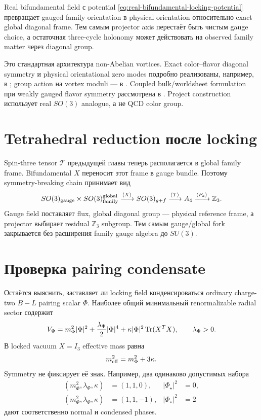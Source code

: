 \begin{theorem}
Real bifundamental field с potential
\eqref{eq:real-bifundamental-locking-potential} превращает gauged family
orientation в physical orientation относительно exact global diagonal
frame. Тем самым projector axis перестаёт быть чистым gauge choice, а
остаточная three-cycle holonomy может действовать на observed family
matter через diagonal group.
\end{theorem}

Это стандартная архитектура non-Abelian vortices. Exact color--flavor
diagonal symmetry и physical orientational zero modes подробно реализованы,
например, в ; group action на vortex moduli ---
в . Coupled bulk/worldsheet formulation при weakly
gauged flavor symmetry рассмотрена в . Project
construction использует real \(SO(3)\) analogue, а не QCD color group.

\section{Tetrahedral reduction после locking}

Spin-three tensor \(\mathcal T\) предыдущей главы теперь располагается в
global family frame. Bifundamental \(X\) переносит этот frame в gauge
bundle. Поэтому symmetry-breaking chain принимает вид
\begin{equation}
 SO(3)_{\rm gauge}\times SO(3)_{\rm family}^{\rm global}
 \xrightarrow{\langle X\rangle}
 SO(3)_{g+f}
 \xrightarrow{\langle\mathcal T\rangle}
 A_4
 \xrightarrow{\langle P_a\rangle}
 \mathbb Z_3.
 \label{eq:locked-tetrahedral-chain}
\end{equation}
Gauge field поставляет flux, global diagonal group --- physical reference
frame, а projector выбирает residual \(\mathbb Z_3\) subgroup. Тем самым
gauge/global fork закрывается без расширения family gauge algebra до
\(SU(3)\).

\section{Проверка pairing condensate}

Остаётся выяснить, заставляет ли locking field конденсироваться ordinary
charge-two \(B-L\) pairing scalar \(\Phi\). Наиболее общий минимальный
renormalizable radial sector содержит
\begin{equation}
 V_\Phi
 =m_\Phi^2|\Phi|^2
 +\frac{\lambda_\Phi}{2}|\Phi|^4
 +\kappa|\Phi|^2\operatorname{Tr}(X^TX),
 \qquad \lambda_\Phi>0.
 \label{eq:generic-locking-pairing-potential}
\end{equation}
В locked vacuum \(X=I_3\) effective mass равна
\begin{equation}
 m_{\rm eff}^2=m_\Phi^2+3\kappa.
\end{equation}
Symmetry не фиксирует её знак. Например, два одинаково допустимых набора
\begin{align}
 (m_\Phi^2,\lambda_\Phi,\kappa)&=(1,1,0),
 &|\Phi_\star|^2&=0,\\
 (m_\Phi^2,\lambda_\Phi,\kappa)&=(1,1,-1),
 &|\Phi_\star|^2&=2
\end{align}
дают соответственно normal и condensed phases.

